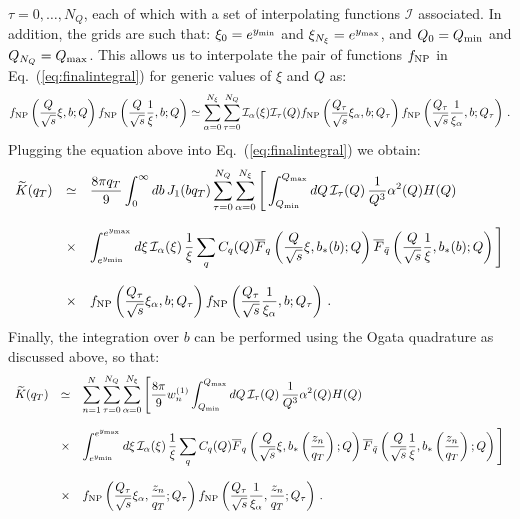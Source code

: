 \documentclass[10pt,a4paper]{article}
\begin{document}
$\tau=0,\dots,N_Q$, each of which with a set of interpolating
functions $\mathcal{I}$ associated. In addition, the grids are such
that: $\xi_0 = e^{y_{\rm min}}$ and $\xi_{N_\xi} = e^{y_{\rm max}}$,
and $Q_0 = Q_{\rm min}$ and $Q_{N_Q} = Q_{\rm max}$. This allows us to
interpolate the pair of functions $f_{\rm NP}$ in
Eq.~(\ref{eq:finalintegral}) for generic values of $\xi$ and $Q$ as:
\begin{equation}\label{eq:interpolation}
f_{\rm NP}\left(\frac{Q}{\sqrt{s}}\xi,b;Q\right) f_{\rm NP}\left(\frac{Q}{\sqrt{s}}\frac1{\xi},b;Q\right) \simeq \sum_{\alpha=0}^{N_\xi}\sum_{\tau=0}^{N_Q}\mathcal{I}_\alpha(\xi)\mathcal{I}_\tau(Q) f_{\rm NP}\left(\frac{Q_\tau}{\sqrt{s}}\xi_\alpha,b;Q_\tau\right) f_{\rm NP}\left(\frac{Q_\tau}{\sqrt{s}}\frac1{\xi_\alpha},b;Q_\tau\right)\,.
\end{equation}
Plugging the equation above into Eq.~(\ref{eq:finalintegral}) we
obtain:
\begin{equation}
\begin{array}{rcl}
\displaystyle  \widetilde{K}(q_T) &\simeq& \displaystyle \frac{8\pi q_T}{9} \int_0^\infty db\, J_1(bq_T)
  \sum_{\tau=0}^{N_Q}\sum_{\alpha=0}^{N_\xi}\Bigg[\int_{Q_{\rm min}}^{Q_{\rm max}}dQ\,\mathcal{I}_\tau(Q)\, 
  \frac{1}{Q^3} \alpha^2(Q) H(Q) 
  \\
\\
&\times& \displaystyle 
                         \int_{e^{y_{\rm
    min}}}^{e^{y_{\rm max}}}d\xi\,\mathcal{I}_\alpha(\xi)\,\frac{1}{\xi} \sum_q C_q(Q)\overline{F}_q\left(\frac{Q}{\sqrt{s}}\xi,b_*(b);Q\right)
                         \overline{F}_{\bar{q}}\left(\frac{Q}{\sqrt{s}}\frac1{\xi},b_*(b);Q\right)\Bigg] \\
\\
&\times& \displaystyle f_{\rm NP}\left(\frac{Q_\tau}{\sqrt{s}}\xi_\alpha,b;Q_\tau\right) f_{\rm NP}\left(\frac{Q_\tau}{\sqrt{s}}\frac1{\xi_\alpha},b;Q_\tau\right)\,.
\end{array}
\end{equation}
Finally, the integration over $b$ can be performed using the Ogata
quadrature as discussed above, so that:
\begin{equation}
\begin{array}{rcl}
\displaystyle  \widetilde{K}(q_T) &\simeq& \displaystyle \sum_{n=1}^N
  \sum_{\tau=0}^{N_Q}\sum_{\alpha=0}^{N_\xi}\Bigg[\frac{8\pi}{9} w_n^{(1)}\int_{Q_{\rm min}}^{Q_{\rm max}}dQ\,\mathcal{I}_\tau(Q)\, 
  \frac{1}{Q^3} \alpha^2(Q) H(Q) 
\\
\\
&\times& \displaystyle 
                         \int_{e^{y_{\rm
    min}}}^{e^{y_{\rm max}}}d\xi\,\mathcal{I}_\alpha(\xi)\,\frac{1}{\xi} \sum_q C_q(Q)\overline{F}_q\left(\frac{Q}{\sqrt{s}}\xi,b_*\left(\frac{z_n}{q_T}\right);Q\right)
                         \overline{F}_{\bar{q}}\left(\frac{Q}{\sqrt{s}}\frac1{\xi},b_*\left(\frac{z_n}{q_T}\right);Q\right)\Bigg] \\
\\
&\times& \displaystyle f_{\rm NP}\left(\frac{Q_\tau}{\sqrt{s}}\xi_\alpha,\frac{z_n}{q_T};Q_\tau\right) f_{\rm NP}\left(\frac{Q_\tau}{\sqrt{s}}\frac1{\xi_\alpha},\frac{z_n}{q_T};Q_\tau\right)\,.
\end{array}
\end{equation}
\end{document}
